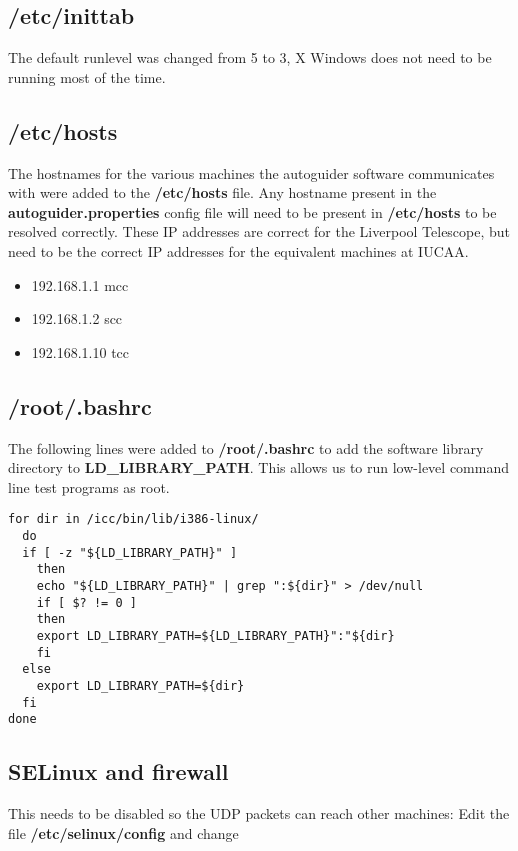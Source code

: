\documentclass[10pt,a4paper]{article}
\begin{document}
\subsection{/etc/inittab}

The default runlevel was changed from 5 to 3, X Windows does not need to be running most of the time.

\subsection{/etc/hosts}

The hostnames for the various machines the autoguider software communicates with were added to the {\bf /etc/hosts} file. Any hostname present in the {\bf autoguider.properties} config file will need to be present in {\bf /etc/hosts} to be resolved correctly. These IP addresses are correct for the Liverpool Telescope, but need to be the correct IP addresses for the equivalent machines at IUCAA.

\begin{itemize}
\item 192.168.1.1     mcc
\item 192.168.1.2     scc
\item 192.168.1.10    tcc
\end{itemize}

\subsection{/root/.bashrc}

The following lines were added to {\bf /root/.bashrc} to add the software library directory to
{\bf LD\_LIBRARY\_PATH}. This allows us to run low-level command line test programs as root.

\begin{verbatim}
for dir in /icc/bin/lib/i386-linux/ 
  do
  if [ -z "${LD_LIBRARY_PATH}" ] 
    then
    echo "${LD_LIBRARY_PATH}" | grep ":${dir}" > /dev/null
    if [ $? != 0 ] 
    then
	export LD_LIBRARY_PATH=${LD_LIBRARY_PATH}":"${dir}
    fi
  else
    export LD_LIBRARY_PATH=${dir}
  fi
done
\end{verbatim}

\subsection{SELinux and firewall}

This needs to be disabled so the UDP packets can reach other machines:
Edit the file {\bf /etc/selinux/config} and change
\end{document}
